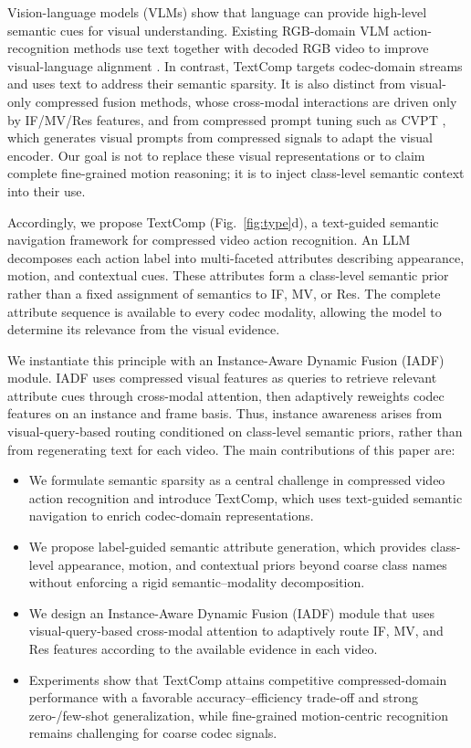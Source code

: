 \documentclass[letterpaper]{article} %
\begin{document}
Vision-language models (VLMs) show that language can provide high-level semantic cues for visual understanding. Existing RGB-domain VLM action-recognition methods use text together with decoded RGB video to improve visual-language alignment \cite{wang2021actionclipnewparadigmvideo,ni2022expanding}. In contrast, TextComp targets codec-domain streams and uses text to address their semantic sparsity. It is also distinct from visual-only compressed fusion methods, whose cross-modal interactions are driven only by IF/MV/Res features, and from compressed prompt tuning such as CVPT \cite{li2023compressed}, which generates visual prompts from compressed signals to adapt the visual encoder. Our goal is not to replace these visual representations or to claim complete fine-grained motion reasoning; it is to inject class-level semantic context into their use.

Accordingly, we propose TextComp (Fig.~\ref{fig:type}d), a text-guided semantic navigation framework for compressed video action recognition. An LLM decomposes each action label into multi-faceted attributes describing appearance, motion, and contextual cues. These attributes form a class-level semantic prior rather than a fixed assignment of semantics to IF, MV, or Res. The complete attribute sequence is available to every codec modality, allowing the model to determine its relevance from the visual evidence.

We instantiate this principle with an Instance-Aware Dynamic Fusion (IADF) module. IADF uses compressed visual features as queries to retrieve relevant attribute cues through cross-modal attention, then adaptively reweights codec features on an instance and frame basis. Thus, instance awareness arises from visual-query-based routing conditioned on class-level semantic priors, rather than from regenerating text for each video. The main contributions of this paper are:
\begin{itemize}
\item We formulate semantic sparsity as a central challenge in compressed video action recognition and introduce TextComp, which uses text-guided semantic navigation to enrich codec-domain representations.
\item We propose label-guided semantic attribute generation, which provides class-level appearance, motion, and contextual priors beyond coarse class names without enforcing a rigid semantic--modality decomposition.
\item We design an Instance-Aware Dynamic Fusion (IADF) module that uses visual-query-based cross-modal attention to adaptively route IF, MV, and Res features according to the available evidence in each video.
\item Experiments show that TextComp attains competitive compressed-domain performance with a favorable accuracy--efficiency trade-off and strong zero-/few-shot generalization, while fine-grained motion-centric recognition remains challenging for coarse codec signals.
\end{itemize}
\end{document}

